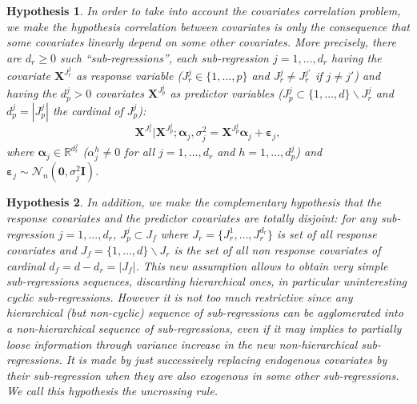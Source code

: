 \documentclass[12pt,a4paper]{report}
\newtheorem{hyp}{Hypothesis}
\begin{document}
\begin{hyp}\label{H1}
In order to take into account the covariates correlation problem, we make the hypothesis correlation between covariates is {\it only} the consequence that some covariates {\it linearly} depend on some other covariates. More precisely, there are $d_{r}\geq 0$ such ``sub-regressions'', each sub-regression $j=1,\ldots,d_{r}$ having the covariate $\boldsymbol{X}^{J_{r}^j}$ as {\it response} variable ($J_{r}^j\in\{1,\ldots,p\}$ and $J_{r}^j\neq J_{r}^{j'}$ if $j\neq j'$) and having the $d_p^j>0$ covariates $\boldsymbol{X}^{J_{p}^j}$  as {\it predictor} variables ($J_{p}^j\subset\{1,\ldots,d\} \backslash J_{r}^j$ and $d_p^j=|J_{p}^j|$ the cardinal of $J_{p}^j$):
\begin{equation}
\boldsymbol{X}^{J_{r}^j}|\boldsymbol{X}^{J_{p}^j};\boldsymbol{\alpha}_j,\sigma^2_j=\boldsymbol{X}^{J_{p}^j}\boldsymbol{\alpha}_j+\boldsymbol{\varepsilon}_j, \label{eq:SR}
\end{equation}
where $\boldsymbol{\alpha}_j\in{\mathbb{R}^{d_r^j}}$ (${\alpha}_j^h\neq 0$ for all $j=1,\ldots,d_r$ and $h=1,\ldots,d_p^j$) and $\boldsymbol{\varepsilon}_j \sim\mathcal{N}_n(\boldsymbol{0},\sigma^2_j\boldsymbol{I})$.
\end{hyp}

\begin{hyp}\label{H2}
In addition, we make the complementary hypothesis that the response covariates and the predictor covariates are totally disjoint: for any sub-regression $j=1,\ldots,d_{r}$, $J_{p}^j\subset J_f$ where $J_{r}=\{J_{r}^1,\ldots,J_{r}^{d_r}\}$ is set of all response covariates and $J_f=\{1,\ldots,d\} \backslash J_{r}$ is the set of all {\it non} response covariates of cardinal $d_f=d-d_r=|J_f|$. This new assumption allows to obtain very simple sub-regressions sequences, discarding hierarchical ones, in particular uninteresting cyclic sub-regressions. However it is not too much restrictive since any hierarchical (but non-cyclic) sequence of sub-regressions can be agglomerated into a non-hierarchical sequence of sub-regressions, even if it may implies to partially loose information through variance increase in the new non-hierarchical sub-regressions. It is made by just successively replacing endogenous covariates by their sub-regression when they are also exogenous in some other sub-regressions. We call this hypothesis the uncrossing rule.
\end{hyp}
\end{document}
